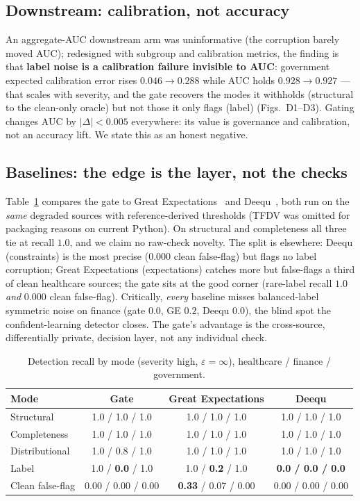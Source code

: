 \documentclass[11pt]{article}
\begin{document}
\subsection{Downstream: calibration, not accuracy}

An aggregate-AUC downstream arm was uninformative (the corruption barely moved
AUC); redesigned with subgroup and calibration metrics, the finding is that
\textbf{label noise is a calibration failure invisible to AUC}: government
expected calibration error rises $0.046\to0.288$ while AUC holds $0.928\to0.927$ ---
that scales with severity, and the gate recovers the modes it withholds (structural
to the clean-only oracle) but not those it only flags (label)
(Figs.~D1--D3). Gating changes AUC by $|\Delta|<0.005$
everywhere: its value is governance and calibration, not an accuracy lift. We state
this as an honest negative.

\subsection{Baselines: the edge is the layer, not the checks}\label{sec:baselines}

Table~\ref{tab:baselines} compares the gate to Great
Expectations~\citep{greatexpectations} and Deequ~\citep{schelter2018deequ}, both
run on the \emph{same} degraded sources with reference-derived thresholds (TFDV was
omitted for packaging reasons on current Python). On structural and completeness
all three tie at recall $1.0$, and we claim no raw-check novelty. The split is
elsewhere: Deequ (constraints) is the most precise (0.000 clean false-flag) but
flags no label corruption; Great Expectations (expectations) catches more but
false-flags a third of clean healthcare sources; the gate sits at the good corner
(rare-label recall $1.0$ \emph{and} 0.000 clean false-flag). Critically,
\emph{every} baseline misses balanced-label symmetric noise on finance (gate
$0.0$, GE $0.2$, Deequ $0.0$), the blind spot the confident-learning detector
closes. The gate's advantage is the cross-source, differentially private,
decision layer, not any individual check.

\begin{table}[t]
\centering
\caption{Detection recall by mode (severity high, $\varepsilon{=}\infty$),
healthcare / finance / government.}
\label{tab:baselines}
\begin{tabular}{lccc}
\toprule
Mode & Gate & Great Expectations & Deequ \\
\midrule
Structural     & 1.0 / 1.0 / 1.0 & 1.0 / 1.0 / 1.0 & 1.0 / 1.0 / 1.0 \\
Completeness   & 1.0 / 1.0 / 1.0 & 1.0 / 1.0 / 1.0 & 1.0 / 1.0 / 1.0 \\
Distributional & 1.0 / 0.8 / 1.0 & 1.0 / 1.0 / 1.0 & 1.0 / 1.0 / 1.0 \\
Label          & 1.0 / \textbf{0.0} / 1.0 & 1.0 / \textbf{0.2} / 1.0 & \textbf{0.0 / 0.0 / 0.0} \\
\midrule
Clean false-flag & 0.00 / 0.00 / 0.00 & \textbf{0.33} / 0.07 / 0.00 & 0.00 / 0.00 / 0.00 \\
\bottomrule
\end{tabular}
\end{table}
\end{document}

